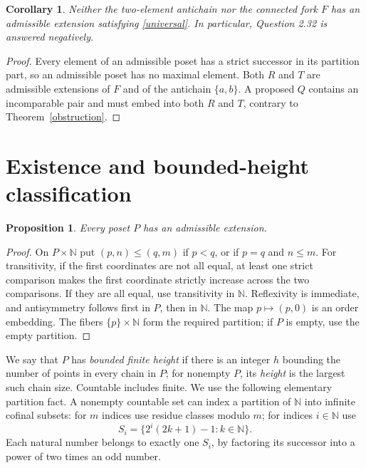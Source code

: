 \documentclass[11pt]{article}
\newtheorem{proposition}[theorem]{Proposition}
\newtheorem{corollary}[theorem]{Corollary}
\newcommand{\N}{\mathbb N}
\begin{document}
\begin{corollary}\label{counterexamples}
Neither the two-element antichain nor the connected fork $F$ has an admissible
extension satisfying \eqref{universal}. In particular, Question 2.32 is answered
negatively.
\end{corollary}
\begin{proof}
Every element of an admissible poset has a strict successor in its partition
part, so an admissible poset has no maximal element. Both $R$ and $T$ are
admissible extensions of $F$ and of the antichain $\{a,b\}$. A proposed $Q$
contains an incomparable pair and must embed into both $R$ and $T$, contrary
to Theorem~\ref{obstruction}.
\end{proof}

\section{Existence and bounded-height classification}
\begin{proposition}\label{existence}
Every poset $P$ has an admissible extension.
\end{proposition}
\begin{proof}
On $P\times\N$ put
$(p,n)\leq(q,m)$ if $p<q$, or if $p=q$ and $n\leq m$.
For transitivity, if the first coordinates are not all equal, at least one
strict comparison makes the first coordinate strictly increase across the
two comparisons. If they are all equal, use transitivity in $\N$.
Reflexivity is immediate, and antisymmetry follows first in $P$, then in
$\N$. The map $p\mapsto(p,0)$ is an order embedding. The fibers
$\{p\}\times\N$ form the required partition; if $P$ is empty, use the empty
partition.
\end{proof}

We say that $P$ has \emph{bounded finite height} if there is an integer $h$
bounding the number of points in every chain in $P$; for nonempty $P$,
its \emph{height} is the largest such chain size. Countable includes finite.
We use the following elementary partition fact. A nonempty countable set
can index a partition of $\N$ into infinite cofinal subsets: for $m$ indices
use residue classes modulo $m$; for indices $i\in\N$ use
\[
 S_i=\{2^i(2k+1)-1:k\in\N\}.
\]
Each natural number belongs to exactly one $S_i$, by factoring its successor
into a power of two times an odd number.
\end{document}
